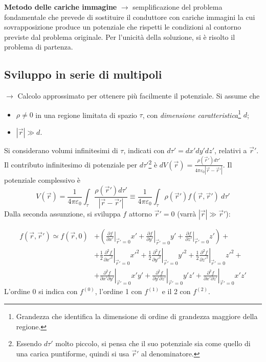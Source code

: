 \documentclass[10pt, a4paper]{scrartcl}
\newcommand*\Eval[3]{\left.#1\right\rvert_{#2}^{#3}}
\numberwithin{equation}{subsection}
\theoremstyle{style1}
\newenvironment{boxenv}[1][]{
    \begin{eqbox}[#1]
    }{
   \end{eqbox}
}
\begin{document}
\textbf{Metodo delle cariche immagine} $\to$ semplificazione del problema fondamentale che prevede di sostituire il conduttore con cariche immagini la cui sovrapposizione produce un potenziale che rispetti le condizioni al contorno previste dal problema originale. Per l'unicit\`a della soluzione, si \`e risolto il problema di partenza. 

\subsection{Sviluppo in serie di multipoli}

$\to$ Calcolo approssimato per ottenere pi\`u facilmente il potenziale. Si assume che
\begin{itemize}
	\item $\rho \neq 0$ in una regione limitata di spazio $\tau $, con \textit{dimensione caratteristica}\footnote{Grandezza che identifica la dimensione di ordine di grandezza maggiore della regione.} $d$;
	\item $\left\lvert \vec{r} \right\rvert \gg d$.
\end{itemize}
Si considerano volumi infinitesimi di $\tau $, indicati con $d\tau '=dx'dy'dz'$, relativi a $\vec{r}'$. Il contributo infinitesimo di potenziale per $d\tau '$\footnote{Essendo $d\tau '$ molto piccolo, si pensa che il suo potenziale sia come quello di una carica puntiforme, quindi si usa $\vec{r}'$ al denominatore.} \`e $dV(\vec{r}) = \frac{\rho (\vec{r}') d\tau '}{4\pi \varepsilon _0 \left\lvert \vec{r}- \vec{r}' \right\rvert }$. Il potenziale complessivo \`e
\begin{equation}
	V(\vec{r}) = \frac{1}{4\pi \varepsilon _0} \int_{\tau } \frac{\rho (\vec{r}') d\tau '}{\left\lvert \vec{r}- \vec{r}' \right\rvert }\equiv \frac{1}{4\pi \varepsilon _0} \int_{\tau } \rho (\vec{r}') f(\vec{r},\vec{r}') \ d\tau '
\end{equation}
Dalla seconda assunzione, si sviluppa $f$ attorno $\vec{r}' = 0$ (varr\`a $\left\lvert \vec{r} \right\rvert \gg\vec{r}'$):
\begin{boxenv}[]
\begin{equation}
\begin{split}
	f(\vec{r},\vec{r}') \simeq f(\vec{r},0) &+\left(\Eval{\frac{\partial f}{\partial x'} }{\vec{r}' = 0}{}x'+ \Eval{\frac{\partial f}{\partial y'} }{\vec{r}' = 0}{}y'+ \Eval{\frac{\partial f}{\partial z'} }{\vec{r}' = 0}{}z'\right) +\\
				   &+\frac{1}{2}\Eval{\frac{\partial ^2f}{\partial x'^2} }{\vec{r}' = 0}{}x'^2+\frac{1}{2}\Eval{\frac{\partial ^2f}{\partial y'^2} }{\vec{r}' = 0}{}y'^2+\frac{1}{2}\Eval{\frac{\partial ^2f}{\partial z'^2} }{\vec{r}' = 0}{}z'^2+\\
				   &+\Eval{\frac{\partial ^2 f}{\partial x'\partial y'} }{\vec{r}'=0}{}x'y'+\Eval{\frac{\partial ^2 f}{\partial y'\partial z'} }{\vec{r}'=0}{}y'z'+\Eval{\frac{\partial ^2 f}{\partial x'\partial z'} }{\vec{r}'=0}{}x'z'
\end{split}
\end{equation}
\noindent L'ordine 0 si indica con $f^{(0)} $, l'ordine 1 con $f^{(1)} $ e il 2 con $f^{(2)} $.
\end{boxenv}
\end{document}
